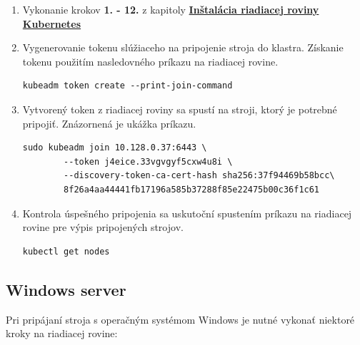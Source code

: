 \begin{enumerate}
\item{\noindent Vykonanie krokov \textbf{1. - 12.} z kapitoly \hyperref[sec:hello]{\textbf{Inštalácia riadiacej roviny Kubernetes}}}
\item{\noindent Vygenerovanie tokenu slúžiaceho na pripojenie stroja do klastra. Získanie tokenu použitím nasledovného príkazu na riadiacej rovine.
\begin{lstlisting}[basicstyle=\footnotesize]
    kubeadm token create --print-join-command
    \end{lstlisting}}
\item{\noindent Vytvorený token z riadiacej roviny sa spustí na stroji, ktorý je potrebné pripojiť. Znázornená je ukážka príkazu.
\begin{lstlisting}[basicstyle=\footnotesize]
    sudo kubeadm join 10.128.0.37:6443 \
        --token j4eice.33vgvgyf5cxw4u8i \
        --discovery-token-ca-cert-hash sha256:37f94469b58bcc\
        8f26a4aa44441fb17196a585b37288f85e22475b00c36f1c61
    \end{lstlisting}}
    \item{\noindent Kontrola úspešného pripojenia sa uskutoční spustením príkazu na riadiacej rovine pre výpis pripojených strojov.
\begin{lstlisting}[language=Bash,basicstyle=\footnotesize]
    kubectl get nodes
    \end{lstlisting}}
\end{enumerate}

\subsection*{Windows server}

Pri pripájaní stroja s operačným systémom Windows je nutné vykonať niektoré kroky na riadiacej rovine:

